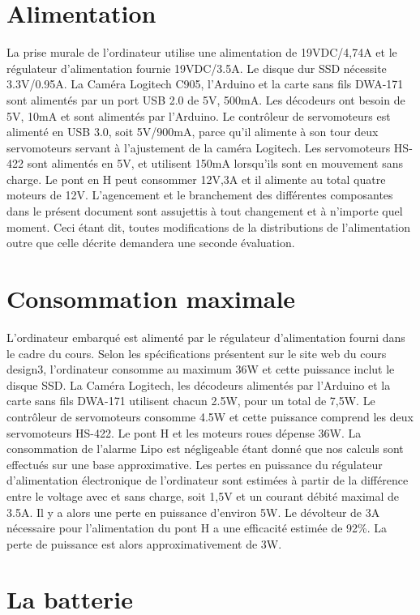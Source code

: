 \section{Alimentation}
  La prise murale de l'ordinateur utilise une alimentation de 19VDC/4,74A et le régulateur d’alimentation fournie 19VDC/3.5A. Le disque dur SSD nécessite 3.3V/0.95A. La Caméra Logitech C905, l’Arduino et la carte sans fils DWA-171 sont alimentés par un port USB 2.0 de 5V, 500mA. Les décodeurs ont besoin de 5V, 10mA et sont alimentés par l’Arduino. Le contrôleur de servomoteurs est alimenté en USB 3.0, soit 5V/900mA, parce qu'il alimente à son tour deux servomoteurs servant à l'ajustement de la caméra Logitech. Les servomoteurs HS-422 sont alimentés en 5V, et utilisent 150mA lorsqu’ils sont en mouvement sans charge. Le pont en H peut consommer 12V,3A et il alimente au total quatre moteurs de 12V. L'agencement et le branchement des différentes composantes dans le présent document sont assujettis à tout changement et à n'importe quel moment. Ceci étant dit, toutes modifications de la distributions de l'alimentation outre que celle décrite demandera une seconde évaluation.  

\section{Consommation maximale}

L’ordinateur embarqué est alimenté par le régulateur d'alimentation fourni dans le cadre du cours. Selon les spécifications présentent sur le site web du cours design3, l'ordinateur consomme au maximum 36W et cette puissance inclut le disque SSD. La Caméra Logitech, les décodeurs alimentés par l’Arduino et la carte sans fils DWA-171 utilisent chacun 2.5W, pour un total de 7,5W. Le contrôleur de servomoteurs consomme 4.5W et cette puissance comprend les deux servomoteurs HS-422. Le pont H et les moteurs roues dépense 36W. La consommation de l’alarme Lipo est négligeable étant donné que nos calculs sont effectués sur une base approximative. Les pertes en puissance du régulateur d'alimentation électronique de l'ordinateur sont estimées à partir de la différence entre le voltage avec et sans charge, soit 1,5V et un courant débité maximal de 3.5A. Il y a alors une perte en puissance d'environ 5W. Le dévolteur de 3A nécessaire pour l'alimentation du pont H a une efficacité estimée de 92\%. La perte de puissance est alors approximativement de 3W.


\section{La batterie}

